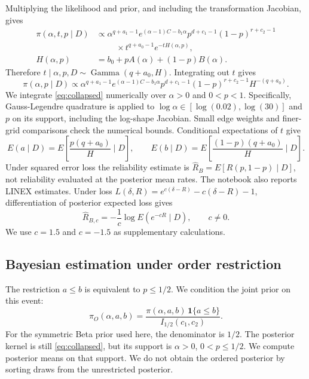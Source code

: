 \documentclass[a4paper,11pt]{article}
\begin{document}
Multiplying the likelihood and prior, and including the transformation Jacobian, gives
\begin{align}
\pi(\alpha,t,p\mid D)&\propto\alpha^{q+a_1-1}e^{(\alpha-1)C-b_1\alpha}
 p^{d+c_1-1}(1-p)^{r+c_2-1}\nonumber\\
&\hspace{1cm}\times t^{q+a_0-1}e^{-tH(\alpha,p)},\label{eq:posterior}\\
H(\alpha,p)&=b_0+pA(\alpha)+(1-p)B(\alpha).\nonumber
\end{align}
Therefore $t\mid\alpha,p,D\sim\operatorname{Gamma}(q+a_0,H)$. Integrating out $t$ gives
\begin{equation}
\pi(\alpha,p\mid D)\propto\alpha^{q+a_1-1}e^{(\alpha-1)C-b_1\alpha}p^{d+c_1-1}(1-p)^{r+c_2-1}H^{-(q+a_0)}.\label{eq:collapsed}
\end{equation}
We integrate \eqref{eq:collapsed} numerically over $\alpha>0$ and $0<p<1$. Specifically, Gauss-Legendre quadrature is applied to $\log\alpha\in[\log(0.02),\log(30)]$ and $p$ on its support, including the log-shape Jacobian. Small edge weights and finer-grid comparisons check the numerical bounds. Conditional expectations of $t$ give
\begin{equation}
E(a\mid D)=E\left[\frac{p(q+a_0)}H\mid D\right],\qquad E(b\mid D)=E\left[\frac{(1-p)(q+a_0)}H\mid D\right].\label{eq:posterior-means}
\end{equation}
Under squared error loss the reliability estimate is $\widehat R_B=E[R(p,1-p)\mid D]$, not reliability evaluated at the posterior mean rates. The notebook also reports LINEX estimates. Under loss $L(\delta,R)=e^{c(\delta-R)}-c(\delta-R)-1$, differentiation of posterior expected loss gives
\begin{equation}
\widehat R_{B,c}=-\frac1c\log E(e^{-cR}\mid D),\qquad c\ne0.\label{eq:linex}
\end{equation}
We use $c=1.5$ and $c=-1.5$ as supplementary calculations.

\subsection{Bayesian estimation under order restriction}\label{sec:ordered-bayes}
The restriction $a\le b$ is equivalent to $p\le1/2$. We condition the joint prior on this event:
\begin{equation}
\pi_O(\alpha,a,b)=\frac{\pi(\alpha,a,b)\,\mathbf1\{a\le b\}}{I_{1/2}(c_1,c_2)}.\label{eq:ordered-prior}
\end{equation}
For the symmetric Beta prior used here, the denominator is $1/2$. The posterior kernel is still \eqref{eq:collapsed}, but its support is $\alpha>0$, $0<p\le1/2$. We compute posterior means on that support. We do not obtain the ordered posterior by sorting draws from the unrestricted posterior.
\end{document}
